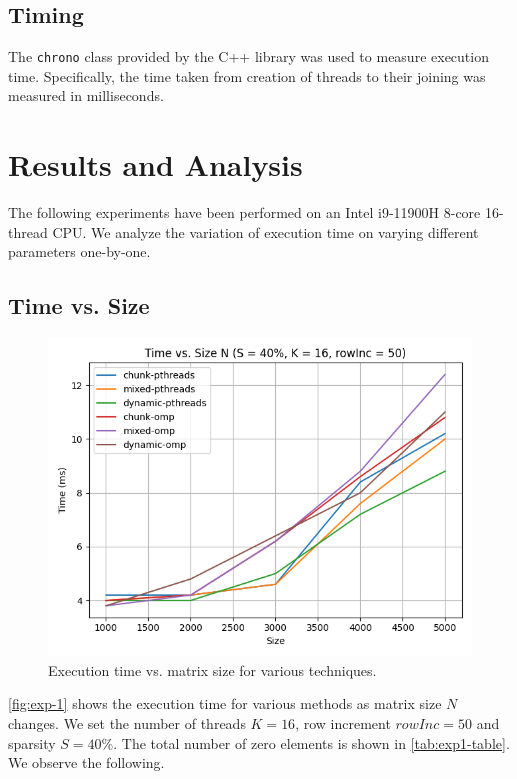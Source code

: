 \documentclass[conference,compsoc]{IEEEtran}
\begin{document}
\subsection{Timing}
\label{sec:timing}

The \texttt{chrono} class provided by the C++ library was used to measure
execution time. Specifically, the time taken from creation of threads to their
joining was measured in milliseconds. 

\section{Results and Analysis}
\label{sec:results-and-analysis}

The following experiments have been performed on an Intel i9-11900H 8-core
16-thread CPU. We analyze the variation of execution time on varying different
parameters one-by-one.

\subsection{Time vs. Size}
\label{subsec:time-vs-size}

\begin{figure}[!ht]
    \includegraphics[width=\columnwidth]{images/exp1.png}
    \caption{Execution time vs. matrix size for various techniques.}
    \label{fig:exp-1}
\end{figure}

\autoref{fig:exp-1} shows the execution time for various methods as matrix size
\(N\) changes. We set the number of threads \(K = 16\), row increment \(rowInc =
50\) and sparsity \(S = 40\%\). The total number of zero elements is shown in
\autoref{tab:exp1-table}. We observe the following.
\end{document}

